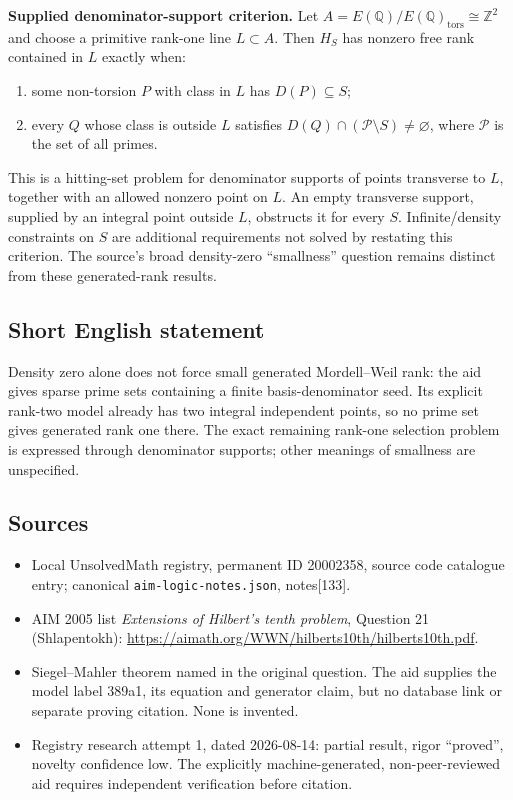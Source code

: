 \documentclass[11pt]{article}
\newcommand{\Z}{\mathbb{Z}}
\newcommand{\Q}{\mathbb{Q}}
\begin{document}
\textbf{Supplied denominator-support criterion.} Let $A=E(\Q)/E(\Q)_{\mathrm{tors}}\cong\Z^2$ and choose a primitive rank-one line $L\subset A$. Then $H_S$ has nonzero free rank contained in $L$ exactly when:
\begin{enumerate}
\item some non-torsion $P$ with class in $L$ has $D(P)\subseteq S$;
\item every $Q$ whose class is outside $L$ satisfies $D(Q)\cap(\mathcal P\setminus S)\ne\varnothing$, where $\mathcal P$ is the set of all primes.
\end{enumerate}
This is a hitting-set problem for denominator supports of points transverse to $L$, together with an allowed nonzero point on $L$. An empty transverse support, supplied by an integral point outside $L$, obstructs it for every $S$. Infinite/density constraints on $S$ are additional requirements not solved by restating this criterion. The source's broad density-zero ``smallness'' question remains distinct from these generated-rank results.
\subsection{Short English statement}
Density zero alone does not force small generated Mordell--Weil rank: the aid gives sparse prime sets containing a finite basis-denominator seed. Its explicit rank-two model already has two integral independent points, so no prime set gives generated rank one there. The exact remaining rank-one selection problem is expressed through denominator supports; other meanings of smallness are unspecified.
\subsection{Sources}
\begin{itemize}
\item Local UnsolvedMath registry, permanent ID 20002358, source code catalogue entry; canonical \texttt{aim-logic-notes.json}, notes[133].
\item AIM 2005 list \emph{Extensions of Hilbert's tenth problem}, Question 21 (Shlapentokh): \url{https://aimath.org/WWN/hilberts10th/hilberts10th.pdf}.
\item Siegel--Mahler theorem named in the original question. The aid supplies the model label 389a1, its equation and generator claim, but no database link or separate proving citation. None is invented.
\item Registry research attempt 1, dated 2026-08-14: partial result, rigor ``proved'', novelty confidence low. The explicitly machine-generated, non-peer-reviewed aid requires independent verification before citation.
\end{itemize}
\end{document}

